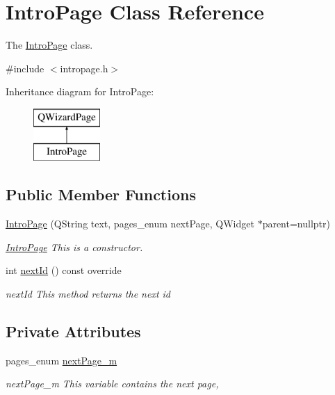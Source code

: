 \hypertarget{class_intro_page}{}\section{Intro\+Page Class Reference}
\label{class_intro_page}


The \mbox{\hyperlink{class_intro_page}{Intro\+Page}} class.  




{\ttfamily \#include $<$intropage.\+h$>$}

Inheritance diagram for Intro\+Page\+:\begin{figure}[H]
\begin{center}
\leavevmode
\includegraphics[height=2.000000cm]{class_intro_page}
\end{center}
\end{figure}
\subsection*{Public Member Functions}
\begin{DoxyCompactItemize}
\item 
\mbox{\hyperlink{class_intro_page_ad984d57f77f15e89e82d1184c997b778}{Intro\+Page}} (Q\+String text, pages\+\_\+enum next\+Page, Q\+Widget $\ast$parent=nullptr)
\begin{DoxyCompactList}\small\item\em \mbox{\hyperlink{class_intro_page}{Intro\+Page}} This is a constructor. \end{DoxyCompactList}\item 
int \mbox{\hyperlink{class_intro_page_a210708d731eaca79e5c0d220c08ad739}{next\+Id}} () const override
\begin{DoxyCompactList}\small\item\em next\+Id This method returns the next id \end{DoxyCompactList}\end{DoxyCompactItemize}
\subsection*{Private Attributes}
\begin{DoxyCompactItemize}
\item 
pages\+\_\+enum \mbox{\hyperlink{class_intro_page_a49cf6740852e8847bb3d9db3106e5d65}{next\+Page\+\_\+m}}
\begin{DoxyCompactList}\small\item\em next\+Page\+\_\+m This variable contains the next page, \end{DoxyCompactList}\end{DoxyCompactItemize}


